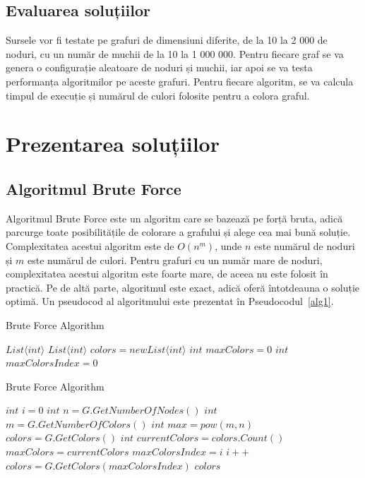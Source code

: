 \documentclass[runningheads]{llncs}
\begin{document}
\subsection{Evaluarea soluțiilor}
Sursele vor fi testate pe grafuri de dimensiuni diferite, de la 10 la 2 000 de noduri,
cu un număr de muchii de la 10 la 1 000 000. Pentru fiecare graf se va genera o
configurație aleatoare de noduri și muchii, iar apoi se va testa performanța
algoritmilor pe aceste grafuri. Pentru fiecare algoritm, se va calcula timpul de
execuție și numărul de culori folosite pentru a colora graful.

\section{Prezentarea soluțiilor}
\subsection{Algoritmul Brute Force}
Algoritmul Brute Force este un algoritm care se bazează pe forță bruta, adică
parcurge toate posibilitățile de colorare a grafului și alege cea mai bună
soluție. Complexitatea acestui algoritm este de $O(n^m)$, unde $n$ este numărul de noduri și $m$ este
numărul de culori. Pentru grafuri cu un număr mare de noduri, complexitatea
acestui algoritm este foarte mare, de aceea nu este folosit în practică. Pe de altă parte,
algoritmul este exact, adică oferă întotdeauna o soluție optimă. Un pseudocod al
algoritmului este prezentat în Pseudocodul~\ref{alg1}.

\begin{algorithm}
\caption{Brute Force Algorithm}
\label{alg1}
\begin{algorithmic}[1]
 \Return $List\langle int\rangle $ 
\State $List\langle int\rangle $ $colors = new List\langle int\rangle $ 
\State $int$ $maxColors = 0$ 
\State $int$ $maxColorsIndex = 0$ 
\end{algorithmic}
\end{algorithm}

\addtocounter{algorithm}{-1}
\begin{algorithm}
\caption{Brute Force Algorithm}
\begin{algorithmic}[1]
\State $int$ $i = 0$ 
\State $int$ $n = G.GetNumberOfNodes()$ 
\State $int$ $m = G.GetNumberOfColors()$ 
\State $int$ $max = pow(m, n)$ 
\State $colors = G.GetColors()$
\State $int$ $currentColors = colors.Count()$
\State $maxColors = currentColors$
\State $maxColorsIndex = i$
\EndIf
\State $i++$
\EndWhile
\State $colors = G.GetColors(maxColorsIndex)$
\State \Return $colors$
\EndProcedure
\end{algorithmic}
\end{algorithm}
\end{document}

